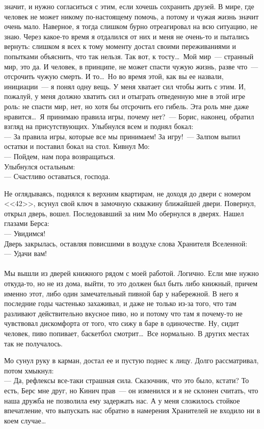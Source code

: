 значит, и нужно согласиться с этим, если хочешь сохранить друзей. В мире, где 
человек не может никому по-настоящему помочь, а потому и чужая жизнь значит 
очень мало. Наверное, я тогда слишком бурно отреагировал на всю ситуацию, не 
знаю. Через какое-то время я отдалился от них и меня не очень-то и пытались 
вернуть: слишком я всех к тому моменту достал своими переживаниями и попытками 
объяснить, что так нельзя. Так вот, к тосту\ldots\ Мой мир~--- странный мир, 
это да. И человек, в принципе, не может спасти чужую жизнь, разве что~--- отсрочить чужую 
смерть. И то\ldots\ Но во время этой, как вы ее назвали, инициации~--- я понял 
одну вещь. У меня хватает сил чтобы жить с этим. И, пожалуй, у меня должно хватить 
сил и отыграть отведенную мне в этой игре роль: не спасти мир, нет, но хотя бы 
отсрочить его гибель. Эта роль мне даже нравится\ldots\ Я принимаю правила 
игры, почему нет?~--- Борис, наконец, обратил взгляд на присутствующих. Улыбнулся 
всем и поднял бокал:\\
--- За правила игры, которые все мы принимаем! За игру!~--- Залпом выпил остатки 
и поставил бокал на стол. Кивнул Мо:\\
--- Пойдем, нам пора возвращаться.\\
Улыбнулся остальным:\\
--- Счастливо оставаться, господа.

Не оглядываясь, поднялся к верхним квартирам, не доходя до двери с номером 
<<42>>, всунул свой ключ в замочную скважину ближайшей двери. Повернул, открыл дверь, 
вошел. Последовавший за ним Мо обернулся в дверях. Нашел глазами Берса:\\
--- Увидимся!\\
Дверь закрылась, оставляя повисшими в воздухе слова Хранителя Вселенной:\\
--- Удачи вам!\\
~\\

Мы вышли из дверей книжного рядом с моей работой. Логично. Если мне нужно 
откуда-то, но не из дома, выйти, то это должен был быть либо книжный, причем 
именно этот, либо один замечательный пивной бар у набережной. В него я 
последние годы частенько захаживал, и даже не только из-за того, что там разливают 
действительно вкусное пиво, но и потому что там я почему-то не чувствовал 
дискомфорта от того, что сижу в баре в одиночестве. Ну, сидит человек, пиво 
попивает, баскетбол смотрит\ldots\ Все нормально. В других местах так не 
получалось.

Мо сунул руку в карман, достал ее и пустую поднес к лицу. Долго рассматривал, 
потом хмыкнул:\\
--- Да, рефлексы все-таки страшная сила. Сказочник, что это было, кстати? То 
есть, Берс мне друг, но Кинич прав~--- он изменился и я не склонен считать, что наша 
дружба не позволила ему задержать нас. А у меня сложилось стойкое впечатление, 
что выпускать нас обратно в намерения Хранителей не входило ни в коем 
случае\ldots


